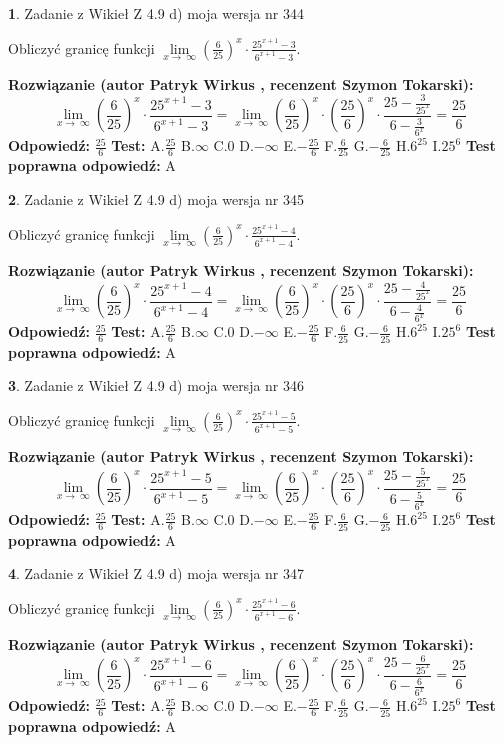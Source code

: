 \documentclass[12pt, a4paper]{article}
\theoremstyle{definition} %
\newtheorem{zad}{}
\newcommand{\zadStart}[1]{\begin{zad}#1\newline}
\newcommand{\zadStop}{\end{zad}}
\newcommand{\rozwStart}[2]{\noindent \textbf{Rozwiązanie (autor #1 , recenzent #2): }\newline}
\newcommand{\rozwStop}{\newline}
\newcommand{\odpStart}{\noindent \textbf{Odpowiedź:}\newline}
\newcommand{\odpStop}{\newline}
\newcommand{\testStart}{\noindent \textbf{Test:}\newline}
\newcommand{\testStop}{\newline}
\newcommand{\kluczStart}{\noindent \textbf{Test poprawna odpowiedź:}\newline}
\newcommand{\kluczStop}{\newline}
\begin{document}
\zadStart{Zadanie z Wikieł Z 4.9 d) moja wersja nr 344}


Obliczyć granicę funkcji  $\lim\limits_{x\to\ \infty}(\frac{6}{25})^{x}\cdot\frac{25^{x+1}-3}{6^{x+1}-3}$.
\zadStop
\rozwStart{Patryk Wirkus}{Szymon Tokarski}
$$\lim\limits_{x\to\ \infty}(\frac{6}{25})^{x}\cdot\frac{25^{x+1}-3}{6^{x+1}-3}=\lim\limits_{x\to\ \infty}(\frac{6}{25})^{x}\cdot(\frac{25}{6})^{x} \cdot \frac{25-\frac{3}{25^{x}}}{6-\frac{3}{6^{x}}} = \frac{25}{6}$$
\rozwStop
\odpStart
$\frac{25}{6}$
\odpStop
\testStart
A.$\frac{25}{6}$ B.$\infty$ C.$0$ D.$-\infty$ E.$-\frac{25}{6}$
F.$\frac{6}{25}$ G.$-\frac{6}{25}$
H.$6^{25}$
I.$25^{6}$
\testStop
\kluczStart
A
\kluczStop



\zadStart{Zadanie z Wikieł Z 4.9 d) moja wersja nr 345}


Obliczyć granicę funkcji  $\lim\limits_{x\to\ \infty}(\frac{6}{25})^{x}\cdot\frac{25^{x+1}-4}{6^{x+1}-4}$.
\zadStop
\rozwStart{Patryk Wirkus}{Szymon Tokarski}
$$\lim\limits_{x\to\ \infty}(\frac{6}{25})^{x}\cdot\frac{25^{x+1}-4}{6^{x+1}-4}=\lim\limits_{x\to\ \infty}(\frac{6}{25})^{x}\cdot(\frac{25}{6})^{x} \cdot \frac{25-\frac{4}{25^{x}}}{6-\frac{4}{6^{x}}} = \frac{25}{6}$$
\rozwStop
\odpStart
$\frac{25}{6}$
\odpStop
\testStart
A.$\frac{25}{6}$ B.$\infty$ C.$0$ D.$-\infty$ E.$-\frac{25}{6}$
F.$\frac{6}{25}$ G.$-\frac{6}{25}$
H.$6^{25}$
I.$25^{6}$
\testStop
\kluczStart
A
\kluczStop



\zadStart{Zadanie z Wikieł Z 4.9 d) moja wersja nr 346}


Obliczyć granicę funkcji  $\lim\limits_{x\to\ \infty}(\frac{6}{25})^{x}\cdot\frac{25^{x+1}-5}{6^{x+1}-5}$.
\zadStop
\rozwStart{Patryk Wirkus}{Szymon Tokarski}
$$\lim\limits_{x\to\ \infty}(\frac{6}{25})^{x}\cdot\frac{25^{x+1}-5}{6^{x+1}-5}=\lim\limits_{x\to\ \infty}(\frac{6}{25})^{x}\cdot(\frac{25}{6})^{x} \cdot \frac{25-\frac{5}{25^{x}}}{6-\frac{5}{6^{x}}} = \frac{25}{6}$$
\rozwStop
\odpStart
$\frac{25}{6}$
\odpStop
\testStart
A.$\frac{25}{6}$ B.$\infty$ C.$0$ D.$-\infty$ E.$-\frac{25}{6}$
F.$\frac{6}{25}$ G.$-\frac{6}{25}$
H.$6^{25}$
I.$25^{6}$
\testStop
\kluczStart
A
\kluczStop



\zadStart{Zadanie z Wikieł Z 4.9 d) moja wersja nr 347}


Obliczyć granicę funkcji  $\lim\limits_{x\to\ \infty}(\frac{6}{25})^{x}\cdot\frac{25^{x+1}-6}{6^{x+1}-6}$.
\zadStop
\rozwStart{Patryk Wirkus}{Szymon Tokarski}
$$\lim\limits_{x\to\ \infty}(\frac{6}{25})^{x}\cdot\frac{25^{x+1}-6}{6^{x+1}-6}=\lim\limits_{x\to\ \infty}(\frac{6}{25})^{x}\cdot(\frac{25}{6})^{x} \cdot \frac{25-\frac{6}{25^{x}}}{6-\frac{6}{6^{x}}} = \frac{25}{6}$$
\rozwStop
\odpStart
$\frac{25}{6}$
\odpStop
\testStart
A.$\frac{25}{6}$ B.$\infty$ C.$0$ D.$-\infty$ E.$-\frac{25}{6}$
F.$\frac{6}{25}$ G.$-\frac{6}{25}$
H.$6^{25}$
I.$25^{6}$
\testStop
\kluczStart
A
\kluczStop
\end{document}
